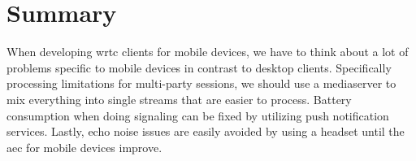 \section{Summary}
When developing \gls{wrtc} clients for mobile devices, we have to think about a lot of problems specific to mobile devices in contrast to desktop clients. Specifically processing limitations for multi-party sessions, we should use a mediaserver to mix everything into single streams that are easier to process. Battery consumption when doing signaling can be fixed by utilizing push notification services. Lastly, echo noise issues are easily avoided by using a headset until the \gls{aec} for mobile devices improve.